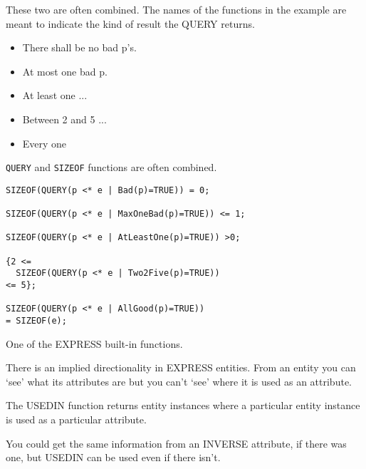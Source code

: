 \begin{remarks}
\remintro
{}

   These two are often combined. The names of the functions in the
example are meant to indicate the kind of result the QUERY returns.

\begin{itemize}
\item There shall be no bad p's.

\item At most one bad p.

\item At least one ...

\item Between 2 and 5 ...

\item Every one

\end{itemize}

\remend
\end{remarks}


    \verb|QUERY| and \verb|SIZEOF| functions are often combined.
\begin{verbatim}
SIZEOF(QUERY(p <* e | Bad(p)=TRUE)) = 0;
 
SIZEOF(QUERY(p <* e | MaxOneBad(p)=TRUE)) <= 1;
 
SIZEOF(QUERY(p <* e | AtLeastOne(p)=TRUE)) >0;

{2 <= 
  SIZEOF(QUERY(p <* e | Two2Five(p)=TRUE))
<= 5};

SIZEOF(QUERY(p <* e | AllGood(p)=TRUE))
= SIZEOF(e);
\end{verbatim}


\begin{remarks}
\remintro
{}

    One of the EXPRESS built-in functions.

    There is an implied directionality in EXPRESS entities. From an entity
you can `see' what its attributes are but you can't `see' where it is used
as an attribute.

    The USEDIN function returns entity instances where a particular
entity instance is used as a particular attribute.

    You could get the same information from an INVERSE attribute, if there
was one, but USEDIN can be used even if there isn't.
    
\remend
\end{remarks}

